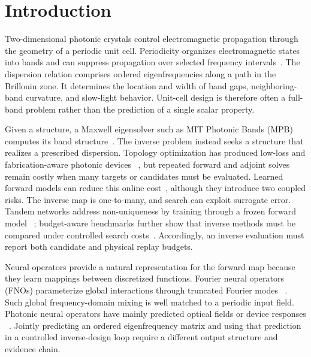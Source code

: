
\section{Introduction}

Two-dimensional photonic crystals control electromagnetic propagation through
the geometry of a periodic unit cell. Periodicity organizes electromagnetic
states into bands and can suppress propagation over selected frequency
intervals~\cite{yablonovitch1987inhibited,john1987localization,
joannopoulos2008photonic}. The dispersion relation comprises ordered
eigenfrequencies along a path in the Brillouin zone. It determines the
location and width of band gaps, neighboring-band curvature, and slow-light
behavior. Unit-cell design is therefore often a full-band problem rather than
the prediction of a single scalar property.

Given a structure, a Maxwell eigensolver such as MIT Photonic Bands (MPB)
computes its band structure~\cite{johnson2001mpb}. The inverse problem instead
seeks a structure that realizes a prescribed dispersion. Topology optimization
has produced low-loss and fabrication-aware photonic devices
~\cite{jensen2004systematic,jensen2011topology,piggott2015demultiplexer,
piggott2017fabrication}, but repeated forward and adjoint solves remain costly
when many targets or candidates must be evaluated. Learned forward models can
reduce this online cost~\cite{peurifoy2018nanophotonic,
tahersima2019splitters}, although they introduce two coupled risks. The inverse
map is one-to-many, and search can exploit surrogate error. Tandem networks
address non-uniqueness by training through a frozen forward model
~\cite{liu2018tandem}; budget-aware benchmarks further show that inverse
methods must be compared under controlled search costs~\cite{ren2020benchmarking}.
Accordingly, an inverse evaluation must report both candidate and physical
replay budgets.

Neural operators provide a natural representation for the forward map because
they learn mappings between discretized functions. Fourier neural operators
(FNOs) parameterize global interactions through truncated Fourier modes
~\cite{li2021fno,kovachki2023neuraloperator}. Such global frequency-domain
mixing is well matched to a periodic input field. Photonic neural operators
have mainly predicted optical fields or device responses
~\cite{gu2022neurolight,zhu2024pace,augenstein2023emno}. Jointly predicting an
ordered eigenfrequency matrix and using that prediction in a controlled
inverse-design loop require a different output structure and evidence chain.

